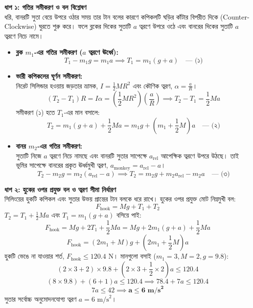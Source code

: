 \documentclass[12pt, a4paper]{article}
\begin{document}
\begin{tcolorbox}[solutionbox={সমাধান (Solution)}]
\noindent
\textbf{ধাপ ১: গতির সমীকরণ ও বল বিশ্লেষণ} \\
ধরি, বানরটি সুতা বেয়ে উপরে ওঠার সময় তার টান বলের কারণে কপিকলটি ঘড়ির কাঁটার বিপরীত দিকে (Counter-Clockwise) ঘুরতে শুরু করে। ফলে ব্লকের দিকের সুতাটি $a$ ত্বরণে উপরে ওঠে এবং বানরের দিকের সুতাটি $a$ ত্বরণে নিচে নামে।

\begin{itemize}[leftmargin=*, parsep=0.5ex]
    \item \textbf{ব্লক $m_1$-এর গতির সমীকরণ ($a$ ত্বরণে ঊর্ধ্বে):} \\
    \[ T_1 - m_1 g = m_1 a \implies T_1 = m_1(g + a) \quad \text{--- (১)} \]
    
    \item \textbf{ভারী কপিকলের ঘূর্ণন সমীকরণ:} \\
    নিরেট সিলিন্ডার হওয়ায় জড়তার ভ্রামক, $I = \frac{1}{2}MR^2$ এবং কৌণিক ত্বরণ, $\alpha = \frac{a}{R}$।
    \[ (T_2 - T_1)R = I\alpha = \left(\frac{1}{2}MR^2\right)\left(\frac{a}{R}\right) \implies T_2 - T_1 = \frac{1}{2}Ma \]
    সমীকরণ (১) হতে $T_1$-এর মান বসালে:
    \[ T_2 = m_1(g + a) + \frac{1}{2}Ma = m_1 g + \left(m_1 + \frac{1}{2}M\right)a \quad \text{--- (২)} \]
    
    \item \textbf{বানর $m_2$-এর গতির সমীকরণ:} \\
    সুতাটি নিজে $a$ ত্বরণে নিচে নামছে এবং বানরটি সুতার সাপেক্ষে $a_{\text{rel}}$ আপেক্ষিক ত্বরণে উপরে উঠছে। তাই ভূমির সাপেক্ষে বানরের প্রকৃত ঊর্ধ্বমুখী ত্বরণ, $a_{\text{monkey}} = a_{\text{rel}} - a$।
    \[ T_2 - m_2 g = m_2(a_{\text{rel}} - a) \implies T_2 = m_2 g + m_2 a_{\text{rel}} - m_2 a \quad \text{--- (৩)} \]
\end{itemize}

\vspace{0.5em}
\noindent
\textbf{ধাপ ২: হুকের ওপর প্রযুক্ত বল ও ত্বরণ সীমা নির্ধারণ} \\
সিলিংয়ের হুকটি কপিকল এবং সুতার উভয় প্রান্তের টান বলকে ধরে রাখে। হুকের ওপর প্রযুক্ত মোট নিম্নমুখী বল:
\[ F_{\text{hook}} = Mg + T_1 + T_2 \]
$T_2 = T_1 + \frac{1}{2}Ma$ এবং $T_1 = m_1(g+a)$ বসিয়ে পাই:
\[ F_{\text{hook}} = Mg + 2T_1 + \frac{1}{2}Ma = Mg + 2m_1(g + a) + \frac{1}{2}Ma \]
\[ F_{\text{hook}} = (2m_1 + M)g + \left(2m_1 + \frac{1}{2}M\right)a \]
হুকটি ভেঙে না যাওয়ার শর্ত, $F_{\text{hook}} \le 120.4\text{ N}$। মানগুলো বসাই ($m_1 = 3, M = 2, g = 9.8$):
\[ (2 \times 3 + 2) \times 9.8 + \left(2 \times 3 + \frac{1}{2} \times 2\right)a \le 120.4 \]
\[ (8 \times 9.8) + (6 + 1)a \le 120.4 \implies 78.4 + 7a \le 120.4 \]
\[ 7a \le 42 \implies \mathbf{a \le 6\text{ m/s}^2} \]
সুতার সর্বোচ্চ অনুমোদনযোগ্য ত্বরণ $a = 6\text{ m/s}^2$।


\end{tcolorbox}
\end{document}
